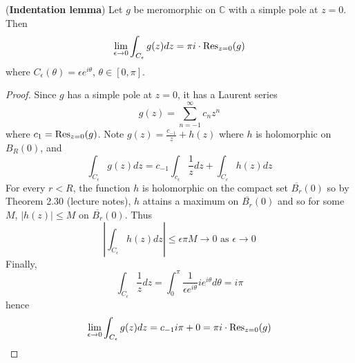 \begin{lemma}\label{lem:indentationLemma}
	(\textbf{Indentation lemma}) Let $g$ be meromorphic on $\mathbb{C}$ with a simple pole at $z = 0$. Then
	\[
		\lim_{\epsilon \to 0} \int_{C_{\epsilon}} g(z) dz = \pi i \cdot \text{Res}_{z = 0}(g)
	\]
	where $C_{\epsilon}(\theta) = \epsilon e^{i\theta}$, $\theta \in [0, \pi]$.
\end{lemma}

\begin{proof}
	Since $g$ has a simple pole at $z = 0$, it has a Laurent series
	\[
		g(z) = \sum_{n = -1}^{\infty} c_n z^n
	\]
	where $c_1 = \text{Res}_{z = 0}(g)$. Note $g(z) = \frac{c_{-1}}{z} + h(z)$ where $h$ is holomorphic on $B_R(0)$, and
	\[
		\int_{C_{\epsilon}} g(z) dz = c_{-1} \int_{c_{\epsilon}} \frac{1}{z} dz + \int_{C_{\epsilon}} h(z) dz
	\]
	For every $r < R$, the function $h$ is holomorphic on the compact set $\overline{B_r}(0)$ so by Theorem 2.30 (lecture notes), $h$ attains a maximum on $\overline{B_r}(0)$ and so for some $M$, $|h(z)| \le M$ on $\overline{B_r}(0)$. Thus
	\[
		\left| \int_{C_{\epsilon}} h(z) dz \right| \le \epsilon \pi M \to 0 \text{ as } \epsilon \to 0
	\]
	Finally,
	\[
		\int_{C_{\epsilon}} \frac{1}{z} dz = \int_{0}^{\pi} \frac{1}{\epsilon e^{i\theta}} i e^{i\theta} d\theta = i \pi
	\]
	hence
	\[
		\lim_{\epsilon \to 0} \int_{C_{\epsilon}} g(z) dz = c_{-1} i \pi + 0 = \pi i \cdot \text{Res}_{z = 0}(g)
	\]
\end{proof}

